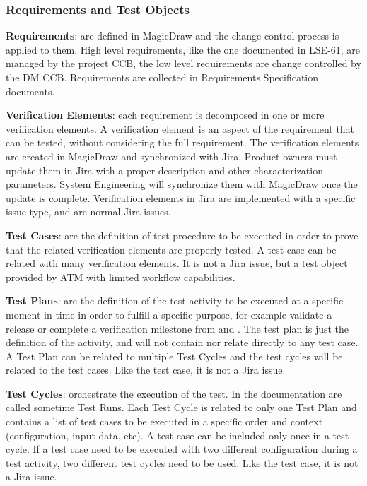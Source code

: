 \subsubsection{Requirements and Test Objects}\label{sect:testobjects}

{\bf Requirements}: are defined in MagicDraw and the change control process is applied to them. High level requirements, like the one documented in LSE-61, are managed by the project CCB, the low level requirements are change controlled by the DM CCB.
Requirements are collected in Requirements Specification documents.

{\bf Verification Elements}: each requirement is decomposed in one or more verification elements. A verification element is an aspect of the requirement that can be tested, without considering the full requirement.
The verification elements are created in MagicDraw and synchronized with Jira.
Product owners must update them in Jira with a proper description and other characterization parameters.
System Engineering will synchronize them with MagicDraw once the update is complete.
Verification elements in Jira are implemented with a specific issue type, and are normal Jira issues.

{\bf Test Cases}: are the definition of test procedure to be executed in order to prove that the related verification elements are properly tested. A test case can be related with many verification elements. 
It is not a Jira issue, but a test object provided by ATM with limited workflow capabilities.

{\bf Test Plans}: are the definition of the test activity to be executed at a specific moment in time in order to fulfill a specific purpose, for example validate a release or complete a verification milestone from  and .
The test plan is just the definition of the activity, and will not contain nor relate directly to any test case.
A Test Plan can be related to multiple Test Cycles and the test cycles will be related to the test cases.
Like the test case, it is not a Jira issue.

{\bf Test Cycles}: orchestrate the execution of the test. In the documentation are called sometime Test Runs.
Each Test Cycle is related to only one Test Plan and contains a list of test cases to be executed in a specific order and context (configuration, input data, etc).
A test case can be included only once in a test cycle. If a test case need to be executed with two different configuration during a test activity, two different test cycles need to be used.
Like the test case, it is not a Jira issue.


